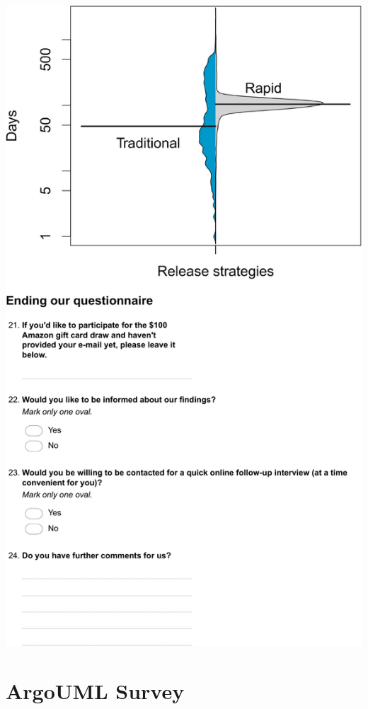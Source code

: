 \documentclass[
	12pt,				%
	openright,			%
	oneside,			%
	a4paper,			%
	french,				%
	spanish,			%
	brazil,				%
	english
	]{abntex2}
\newcounter{pt}
\newcounter{th}
\begin{document}
\begin{apendicesenv}
\includegraphics[width=.8\textwidth,keepaspectratio]{chapters/chapter5/appendix/Firefox7.pdf}

\chapter{ArgoUML Survey}\label{appendix:b}


\end{apendicesenv}
\end{document}
